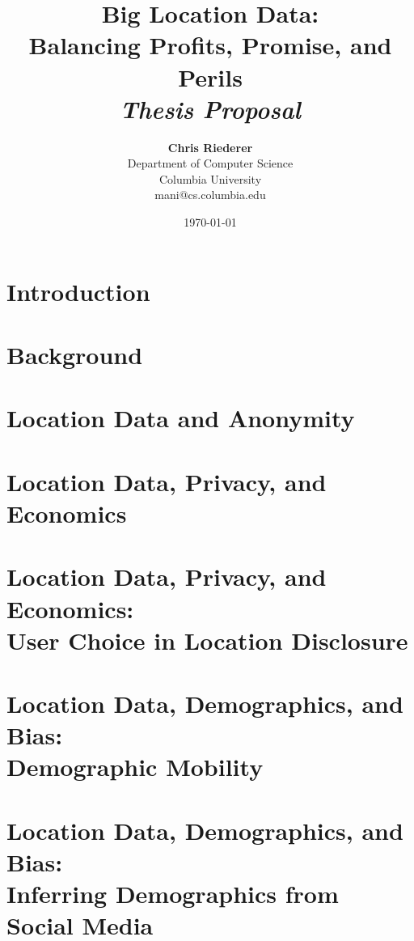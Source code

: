 \documentclass[12pt]{article}
\title{{\bf Big Location Data: \\ Balancing Profits, Promise, and Perils} \\
\it Thesis Proposal}
\author{ {\bf Chris Riederer}  \\
Department of Computer Science \\
Columbia University\\
{\small mani@cs.columbia.edu}
}
\date{\today}
\begin{document}
\pagestyle{plain}
\maketitle

\pagebreak
\begin{abstract}

\end{abstract}

\pagebreak
\tableofcontents
\pagebreak

\cleardoublepage
{}

\section{Introduction}
\label{ch:intro}



\section{Background}
\label{sec:background}



\section{Location Data and Anonymity}
\label{sec:anon}



\section{Location Data, Privacy, and Economics}
\label{sec:econ}



\section{Location Data, Privacy, and Economics: \\User Choice in Location Disclosure}
\label{sec:keyword}



\section{Location Data, Demographics, and Bias: \\Demographic Mobility}
\label{sec:bias}




\section{Location Data, Demographics, and Bias: \\Inferring Demographics from Social Media}
\label{sec:demo}

\end{document}
